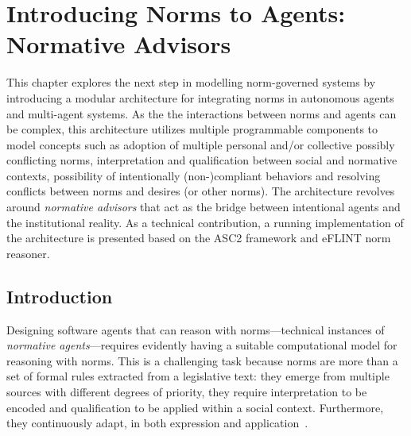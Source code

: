 \chapter{Introducing Norms to Agents: Normative Advisors}
\label{ch:normative_advisors}
This chapter explores the next step in modelling norm-governed systems by introducing a modular architecture for integrating norms in autonomous agents and multi-agent systems. As the the interactions between norms and agents can be complex, this architecture utilizes multiple programmable components to model concepts such as adoption of multiple personal and/or collective possibly conflicting norms, interpretation and qualification between social and normative contexts, possibility of intentionally (non-)compliant behaviors and resolving conflicts between norms and desires (or other norms). The architecture revolves around \emph{normative advisors} that act as the bridge between intentional agents and the institutional reality. As a technical contribution, a running implementation of the architecture is presented based on the ASC2 framework and eFLINT norm reasoner. 


\section{Introduction}
Designing software agents that can reason with norms---technical instances of \emph{normative agents}---requires evidently having a suitable computational model for reasoning with norms. This is a challenging task because norms are more than a set of formal rules extracted from a legislative text: they emerge from multiple sources with different degrees of priority, they require interpretation to be encoded and qualification to be applied within a social context. Furthermore, they continuously adapt, in both expression and application~\cite{Boella2014APractice}. 

